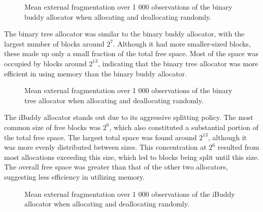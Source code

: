 \begin{figure}[h]
  \centering
  
  \caption{Mean external fragmentation over 1 000 observations of the binary buddy allocator when allocating and deallocating randomly.}
  \label{fig:fragextbinary}
\end{figure}

The binary tree allocator was similar to the binary buddy allocator, with the largest number of blocks around $2^7$. Although it had more smaller-sized blocks, these made up only a small fraction of the total free space. Most of the space was occupied by blocks around $2^{13}$, indicating that the binary tree allocator was more efficient in using memory than the binary buddy allocator.

\begin{figure}[h]
  \centering
  
  \caption{Mean external fragmentation over 1 000 observations of the binary tree allocator when allocating and deallocating randomly.}
  \label{fig:fragextbt}
\end{figure}

The iBuddy allocator stands out due to its aggressive splitting policy. The most common size of free blocks was $2^6$, which also constituted a substantial portion of the total free space. The largest total space was found around $2^{13}$, although it was more evenly distributed between sizes. This concentration at $2^6$ resulted from most allocations exceeding this size, which led to blocks being split until this size. The overall free space was greater than that of the other two allocators, suggesting less efficiency in utilizing memory.

\begin{figure}[h]
  \centering
  
  \caption{Mean external fragmentation over 1 000 observations of the iBuddy allocator when allocating and deallocating randomly.}
  \label{fig:fragextibuddy}
\end{figure}

